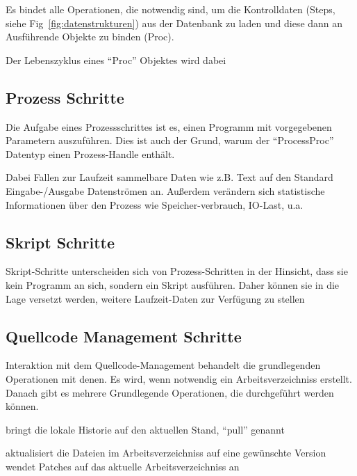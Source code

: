 Es bindet alle Operationen, die notwendig sind,
um die Kontrolldaten (Steps, siehe Fig~\ref{fig:datenstrukturen})
aus der Datenbank zu laden und diese dann an Ausführende Objekte zu binden (Proc).

Der Lebenszyklus eines ``Proc'' Objektes wird dabei


\subsection{Prozess Schritte}

Die Aufgabe eines Prozessschrittes ist es,
einen Programm mit vorgegebenen Parametern auszuführen.
Dies ist auch der Grund, warum der ``ProcessProc'' Datentyp einen
Prozess-Handle enthält.

Dabei Fallen zur Laufzeit sammelbare Daten wie z.B. Text auf den Standard Eingabe-/Ausgabe Datenströmen an.
Außerdem verändern sich statistische Informationen über den Prozess wie Speicher-verbrauch, IO-Last, u.a.


\subsection{Skript Schritte}

Skript-Schritte unterscheiden sich von Prozess-Schritten in der Hinsicht,
dass sie kein Programm an sich, sondern ein Skript ausführen.
Daher können sie in die Lage versetzt werden,
weitere Laufzeit-Daten zur Verfügung zu stellen


\subsection{Quellcode Management Schritte}

Interaktion mit dem Quellcode-Management behandelt die grundlegenden Operationen mit denen. %
Es wird, wenn notwendig ein Arbeitsverzeichniss erstellt.
Danach gibt es mehrere Grundlegende Operationen, die durchgeführt werden können.

\begin{description}
        bringt die lokale Historie auf den aktuellen Stand, ``pull'' genannt

        aktualisiert die Dateien im Arbeitsverzeichniss
        auf eine gewünschte Version
        wendet Patches auf das aktuelle Arbeitsverzeichniss an
\end{description}

